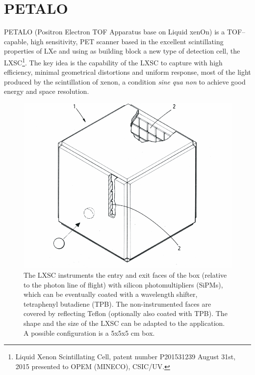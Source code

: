 \documentclass[review]{elsarticle}
\begin{document}
\section{PETALO}\label{sec.petalo}

PETALO (Positron Electron TOF Apparatus base on Liquid xenOn) is a TOF--capable, high sensitivity, PET scanner based in the excellent scintillating properties of LXe and using as building block a new type of detection cell,  the LXSC\footnote{Liquid Xenon Scintillating Cell, patent number P201531239 August 31st, 2015 presented to OPEM (MINECO), CSIC/UV.}. The key idea is the capability of the LXSC to capture with high efficiency, minimal geometrical distortions and uniform response, most of the light produced by the scintillation of xenon, a condition \emph{sine qua non} to achieve good energy and space resolution. 

\begin{figure}[!htbp]
	\centering
	\includegraphics[scale=0.6]{../img/LXSC2.pdf}
	\caption{\label{fig.box} The LXSC instruments the entry and exit faces of the box (relative to the photon line of flight) with silicon photomultipliers (SiPMs), which can be eventually coated with a wavelength shifter, tetraphenyl butadiene (TPB). The non-instrumented faces are covered by reflecting Teflon (optionally also coated with TPB). The shape and the size of the LXSC can be adapted to the application. A possible configuration is a 5x5x5 cm box.}
\end{figure}
\end{document}
